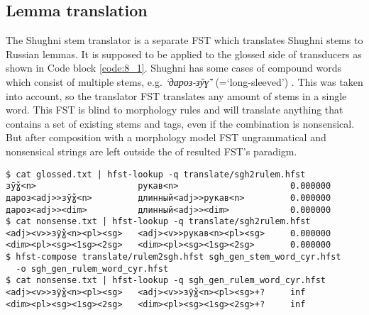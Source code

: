 \subsection{Lemma translation} \label{rulemm_section}
The Shughni stem translator is a separate FST which translates Shughni stems to Russian lemmas. It is supposed to be applied to the glossed side of transducers as shown in Code block \ref{code:8_1}. Shughni has some cases of compound words which consist of multiple stems, e.g. \textit{`дароз-зӯɣ̌'} (=`long-sleeved') \parencite[173]{parker_shughni_2023}. This was taken into account, so the translator FST translates any amount of stems in a single word. This FST is blind to morphology rules and will translate anything that contains a set of existing stems and tags, even if the combination is nonsensical. But after composition with a morphology model FST ungrammatical and nonsensical strings are left outside the of resulted FST's paradigm.

\begin{code_frame}[float,floatplacement=h!]
    \begin{footnotesize}\codespacing
    \begin{verbatim}
$ cat glossed.txt | hfst-lookup -q translate/sgh2rulem.hfst 
зӯɣ̌<n>                    рукав<n>                      0.000000
дароз<adj>>зӯɣ̌<n>         длинный<adj>>рукав<n>         0.000000
дароз<adj>><dim>          длинный<adj>><dim>            0.000000
$ cat nonsense.txt | hfst-lookup -q translate/sgh2rulem.hfst 
<adj><v>>зӯɣ̌<n><pl><sg>   <adj><v>>рукав<n><pl><sg>     0.000000
<dim><pl><sg><1sg><2sg>   <dim><pl><sg><1sg><2sg>       0.000000
$ hfst-compose translate/rulem2sgh.hfst sgh_gen_stem_word_cyr.hfst
  -o sgh_gen_rulem_word_cyr.hfst
$ cat nonsense.txt | hfst-lookup -q sgh_gen_rulem_word_cyr.hfst
<adj><v>>зӯɣ̌<n><pl><sg>   <adj><v>>зӯɣ̌<n><pl><sg>+?     inf
<dim><pl><sg><1sg><2sg>   <dim><pl><sg><1sg><2sg>+?     inf
    \end{verbatim}
    \end{footnotesize}
    \tcblower
    \label{code:8_1}
\end{code_frame}

